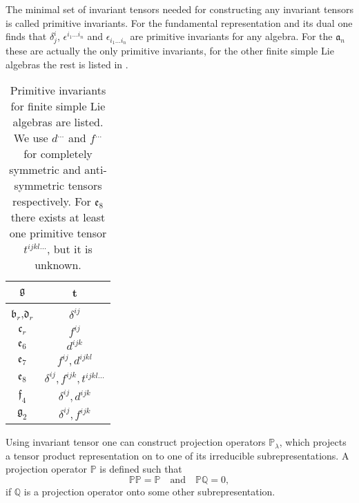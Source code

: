 The minimal set of invariant tensors needed for constructing any invariant tensors is called  primitive invariants. For the fundamental representation and its dual one finds that $\delta^i_j$, $\epsilon^{i_1\ldots i_n}$ and $\epsilon_{i_1\ldots i_n}$ are primitive invariants for any algebra. For the $\mathfrak{a}_n$ these are actually the only primitive invariants, for the other finite simple Lie algebras the rest is listed in .
\begin{table}\centering
    \caption{Primitive invariants for finite simple Lie algebras are listed. We use $d^{\ldots}$ and $f^{\ldots}$ for completely symmetric and anti-symmetric tensors respectively. For $\mathfrak{e}_8$ there exists at least one primitive tensor $t^{ijkl\ldots}$, but it is unknown.}
    \label{tab:PrimInvariant}
    \begin{tabular}{|c|c|}\hline
        $\mathfrak{g}$ & t\\\hline
        $\mathfrak{b}_r$,$\mathfrak{d}_r$ & $\delta^{ij}$\\\hline
        $\mathfrak{c}_r$ & $f^{ij}$\\\hline
        $\mathfrak{e}_6$ & $d^{ijk}$\\\hline
        $\mathfrak{e}_7$ & $f^{ij},d^{ijkl}$\\\hline
        $\mathfrak{e}_8$ & $\delta^{ij},f^{ijk},t^{ijkl\ldots}$\\\hline
        $\mathfrak{f}_4$ & $\delta^{ij},d^{ijk}$\\\hline
        $\mathfrak{g}_2$ & $\delta^{ij},f^{ijk}$\\\hline
    \end{tabular}
\end{table}

Using invariant tensor one can construct projection operators $\mathbb{P}_\lambda$, which projects a tensor product representation on to one of its irreducible subrepresentations. A projection operator $\mathbb{P}$ is defined such that 
\begin{equation}
    \mathbb{P}\mathbb{P} = \mathbb{P}\quad \text{and}\quad \mathbb{P}\mathbb{Q} = 0,
\end{equation}
if $\mathbb{Q}$ is a projection operator onto some other subrepresentation.

